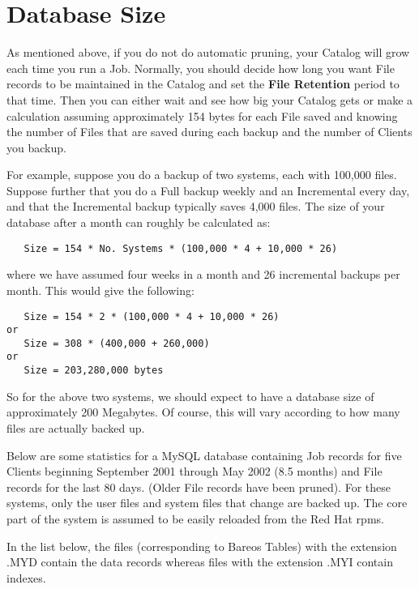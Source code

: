 \section{Database Size}
\label{Size}

As mentioned above, if you do not do automatic pruning, your Catalog will grow
each time you run a Job. Normally, you should decide how long you want File
records to be maintained in the Catalog and set the {\bf File Retention}
period to that time. Then you can either wait and see how big your Catalog
gets or make a calculation assuming approximately 154 bytes for each File
saved and knowing the number of Files that are saved during each backup and
the number of Clients you backup.

For example, suppose you do a backup of two systems, each with 100,000 files.
Suppose further that you do a Full backup weekly and an Incremental every day,
and that the Incremental backup typically saves 4,000 files. The size of your
database after a month can roughly be calculated as:

\footnotesize
\begin{verbatim}
   Size = 154 * No. Systems * (100,000 * 4 + 10,000 * 26)
\end{verbatim}
\normalsize

where we have assumed four weeks in a month and 26 incremental backups per month.
This would give the following:

\footnotesize
\begin{verbatim}
   Size = 154 * 2 * (100,000 * 4 + 10,000 * 26)
or
   Size = 308 * (400,000 + 260,000)
or
   Size = 203,280,000 bytes
\end{verbatim}
\normalsize

So for the above two systems, we should expect to have a database size of
approximately 200 Megabytes. Of course, this will vary according to how many
files are actually backed up.

Below are some statistics for a MySQL database containing Job records for five
Clients beginning September 2001 through May 2002 (8.5 months) and File
records for the last 80 days. (Older File records have been pruned). For these
systems, only the user files and system files that change are backed up. The
core part of the system is assumed to be easily reloaded from the Red Hat rpms.


In the list below, the files (corresponding to Bareos Tables) with the
extension .MYD contain the data records whereas files with the extension .MYI
contain indexes.

